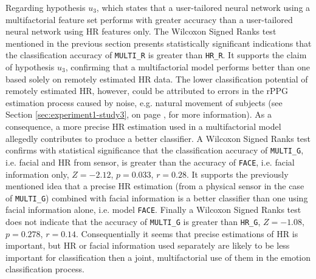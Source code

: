 Regarding hypothesis $u_3$, which states that a user-tailored neural network using a multifactorial feature set performs with greater accuracy than a user-tailored neural network using HR features only. The Wilcoxon Signed Ranks test mentioned in the previous section presents statistically significant indications that the classification accuracy of \texttt{MULTI\_R} is greater than \texttt{HR\_R}. It supports the claim of hypothesis $u_3$, confirming that a multifactorial model performs better than one based solely on remotely estimated HR data. The lower classification potential of remotely estimated HR, however, could be attributed to errors in the rPPG estimation process caused by noise, e.g. natural movement of subjects (see Section \ref{sec:experiment1-study3}, on page \pageref{sec:experiment1-study3}, for more information). As a consequence, a more precise HR estimation used in a multifactorial model allegedly contributes to produce a better classifier. A Wilcoxon Signed Ranks test confirms with statistical significance that the classification accuracy of \texttt{MULTI\_G}, i.e. facial and HR from sensor, is greater than the accuracy of \texttt{FACE}, i.e. facial information only, $Z=-2.12$, $p=0.033$, $r=0.28$. It supports the previously mentioned idea that a precise HR estimation (from a physical sensor in the case of \texttt{MULTI\_G}) combined with facial information is a better classifier than one using facial information alone, i.e. model \texttt{FACE}. Finally a Wilcoxon Signed Ranks test does not indicate that the accuracy of \texttt{MULTI\_G} is greater than \texttt{HR\_G}, $Z=-1.08$, $p=0.278$, $r=0.14$. Consequentially it seems that precise estimations of HR is important, but HR or facial information used separately are likely to be less important for classification then a joint, multifactorial use of them in the emotion classification process.

